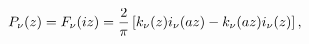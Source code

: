 \begin{equation}
    \label{pdefinition}
P_\nu(z)=F_\nu(i z)={2\over \pi}
\left[ k_\nu(z)i_\nu(a z)-k_\nu(a z)i_\nu(z)\right],
\end{equation}


